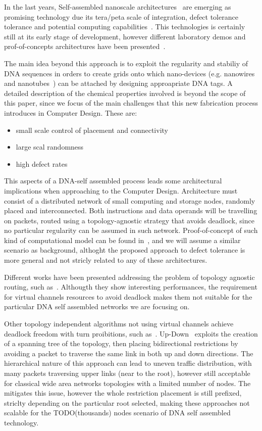 \documentclass[final,journal,letterpaper]{IEEEtran}
\begin{document}
In the last years, Self-assembled nanoscale architectures~\cite{TOOD}
are emerging as promising technology due its tera/peta scale of
integration, defect tolerance tolerance and potential computing
capabilities~\cite{TODO}. This technologies is certainly still at its
early stage of development, however different laboratory demos and
prof-of-concepts architectures have been presented~\cite{TODO}.

The main idea beyond this approach is to exploit the regularity and
stabiliy of DNA sequences in orders to create grids onto which
nano-devices (e.g. nanowires and nanotubes~\cite{TODO}) can be attached by
designing approapriate DNA tags. A detailed description of the
chemical properties involved is beyond the scope of this paper, since
we focus of the main challenges that this new fabrication process
introduces in Computer Design. These are:
\begin{itemize}
\item small scale control of placement and connectivity
\item large scal randomness
\item high defect rates
\end{itemize}


This aspects of a DNA-self assembled process leads some architectural
implications when approaching to the Computer Design. Architecture
must consist of a distributed network of small computing and storage
nodes, randomly placed and interconnected. Both instructions and
data operands will be travelling on packets, routed using a
topology-agnostic strategy that avoids deadlock, since
no particular regularity can be assumed in such network.
Proof-of-concept of such kind of computational model can be found
in~\cite{}, and we will assume a similar scenario as background,
althoght the proposed approach to defect tolerance is more general and not stricly related
to any of these architectures.

Different works have been presented addressing the problem of topology
agnostic routing, such as~\cite{}. Althougth they show interesting
performances, the requirement for virtual channels resources 
to avoid deadlock makes them not suitable for the particular DNA self
assembled networks we are focusing on. 

Other topology independent algorithms not using virtual channels
achieve deadlock freedom with turn proibitions, such as~\cite{}.
Up-Down~\cite{} exploits the creation of a spanning tree of the
topology, then placing bidirectional restrictions by avoiding a packet
to traverse the same link in both up and down directions. The
hierarchical nature of this approach can lead to uneven traffic
distribution, with many packets traversing upper links (near to the
root), however still acceptable for classical wide area networks
topologies with a limited number of nodes.  The~\cite{} mitigates this
issue, however the whole restriction placement is still prefixed,
striclty depending on the particular root selected, making these
approaches not scalable for the TODO(thousands) nodes scenario of DNA
self assembled technology.
\end{document}
